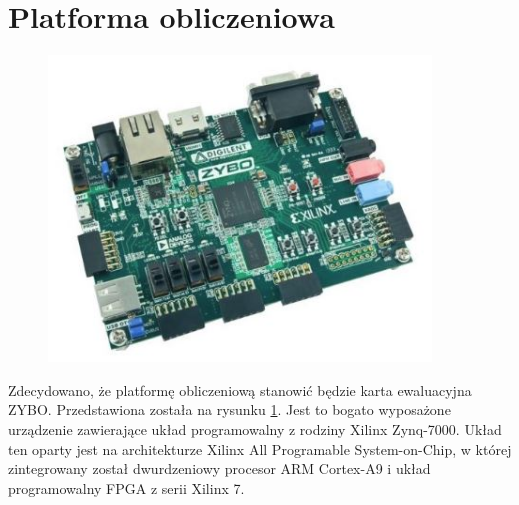 \section{Platforma obliczeniowa}
\label{sec:platformaobliczeniowa}


\begin{figure}[H]
	\centering
	\includegraphics[width=4in]{zybo.jpg}
	\label{fig:zybo}
\end{figure}

Zdecydowano, że platformę obliczeniową stanowić będzie karta ewaluacyjna ZYBO. %
Przedstawiona została na rysunku \ref{fig:zybo}.
Jest to bogato wyposażone urządzenie zawierające układ programowalny z rodziny Xilinx Zynq-7000. %
Układ ten oparty jest na architekturze Xilinx All Programable System-on-Chip, w której zintegrowany został dwurdzeniowy procesor ARM Cortex-A9 i układ programowalny FPGA z serii Xilinx 7.

